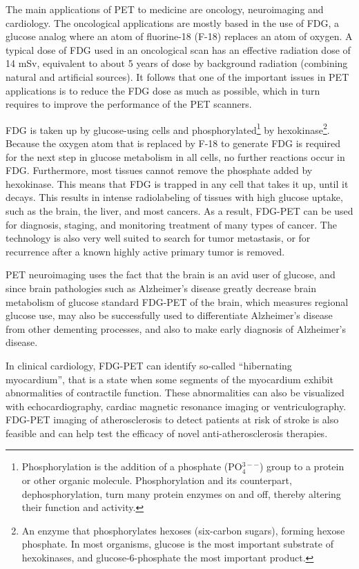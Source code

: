 The main applications of PET to medicine are oncology, neuroimaging and cardiology. The oncological applications are mostly based in the use of FDG, a glucose analog where an atom of fluorine-18 (F-18) replaces an atom of oxygen. A typical dose of FDG used in an oncological scan has an effective radiation dose of 14 mSv, equivalent to about 5 years of dose by background radiation (combining natural and artificial sources). It follows that one of the important issues in PET applications is to reduce the FDG dose as much as possible, which in turn requires to improve the performance of the PET scanners.

FDG is taken up by glucose-using cells and phosphorylated\footnote{Phosphorylation is the addition of a phosphate (PO$_4^{3--}$) group to a protein or other organic molecule. Phosphorylation and its counterpart, dephosphorylation, turn many protein enzymes on and off, thereby altering their function and activity.} by hexokinase\footnote{An enzyme that phosphorylates hexoses (six-carbon sugars), forming hexose phosphate. In most organisms, glucose is the most important substrate of hexokinases, and glucose-6-phosphate the most important product.}. Because the oxygen atom that is replaced by F-18 to generate FDG is required for the next step in glucose metabolism in all cells, no further reactions occur in FDG. Furthermore, most tissues cannot remove the phosphate added by hexokinase. This means that FDG is trapped in any cell that takes it up, until it decays. This results in intense radiolabeling of tissues with high glucose uptake, such as the brain, the liver, and most cancers. As a result, FDG-PET can be used for diagnosis, staging, and monitoring treatment of many types of cancer. The technology is also very well suited to search for tumor metastasis, or for recurrence after a known highly active primary tumor is removed. 

PET neuroimaging uses the fact that the brain is an avid user of glucose, and since brain pathologies such as Alzheimer's disease greatly decrease brain metabolism of glucose standard FDG-PET of the brain, which measures regional glucose use, may also be successfully used to differentiate Alzheimer's disease from other dementing processes, and also to make early diagnosis of Alzheimer's disease. 

In clinical cardiology, FDG-PET can identify so-called ``hibernating myocardium'', that is a state when some segments of the myocardium exhibit abnormalities of contractile function. These abnormalities can also be visualized with echocardiography, cardiac magnetic resonance imaging or ventriculography. FDG-PET imaging of atherosclerosis to detect patients at risk of stroke is also feasible and can help test the efficacy of novel anti-atherosclerosis therapies.

